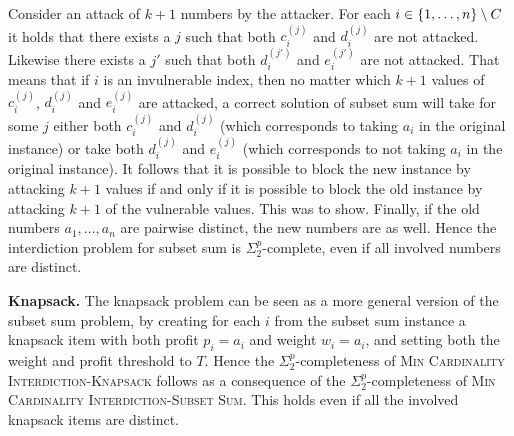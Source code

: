 Consider an attack of $k+1$ numbers by the attacker. For each $i \in \{ 1, \ldots, n \} \setminus C$ it holds that there exists a $j$ such that both $c_i^{(j)}$ and $d_i^{(j)}$ are not attacked. Likewise there exists a $j'$ such that both $d_i^{(j')}$ and $e_i^{(j')}$ are not attacked. 
That means that if $i$ is an invulnerable index, then no matter which $k+1$ values of  $c_i^{(j)}$, $d_i^{(j)}$ and  $e_i^{(j)}$ are attacked, 
a correct solution of subset sum will take for some $j$ either both $c_i^{(j)}$ and $d_i^{(j)}$ (which corresponds to taking $a_i$ in the original instance) 
or take both $d_i^{(j)}$ and $e_i^{(j)}$ (which corresponds to not taking $a_i$ in the original instance).
It follows that it is possible to block the new instance by attacking $k+1$ values if and only if it is possible to block the old instance by attacking $k+1$ of the vulnerable values. 
This was to show.
Finally, if the old numbers $a_1, \dots, a_n$ are pairwise distinct, the new numbers are as well. Hence the interdiction problem for subset sum is $\Sigma^p_2$-complete, even if all involved numbers are distinct.

\textbf{Knapsack.} The knapsack problem can be seen as a more general version of the subset sum problem, by creating for each $i$ 
from the subset sum instance a knapsack item with both profit $p_i = a_i$ and weight $w_i = a_i$, and setting both the weight and profit threshold to $T$.
Hence the $\Sigma^p_2$-completeness of \textsc{Min Cardinality Interdiction-Knapsack} follows as a consequence of the $\Sigma^p_2$-completeness of \textsc{Min Cardinality Interdiction-Subset Sum}. This holds even if all the involved knapsack items are distinct.

